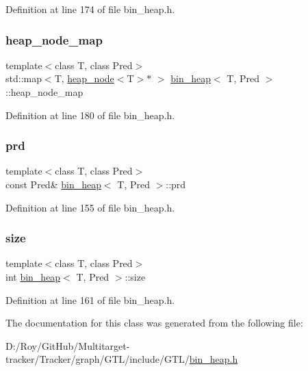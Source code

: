 Definition at line 174 of file bin\+\_\+heap.\+h.

\mbox{\label{classbin__heap_ab646175f97b352ca26587d23bf57c79f}} 
\subsubsection{\texorpdfstring{heap\+\_\+node\+\_\+map}{heap\_node\_map}}
{\footnotesize\ttfamily template$<$class T, class Pred$>$ \\
std\+::map$<$T, \mbox{\hyperlink{classheap__node}{heap\+\_\+node}}$<$T$>$$\ast$ $>$ \mbox{\hyperlink{classbin__heap}{bin\+\_\+heap}}$<$ T, Pred $>$\+::heap\+\_\+node\+\_\+map\hspace{0.3cm}{\ttfamily [private]}}



Definition at line 180 of file bin\+\_\+heap.\+h.

\mbox{\label{classbin__heap_a5ecc420dfd03a6a0b4c9328cac1fae14}} 
\subsubsection{\texorpdfstring{prd}{prd}}
{\footnotesize\ttfamily template$<$class T, class Pred$>$ \\
const Pred\& \mbox{\hyperlink{classbin__heap}{bin\+\_\+heap}}$<$ T, Pred $>$\+::prd\hspace{0.3cm}{\ttfamily [private]}}



Definition at line 155 of file bin\+\_\+heap.\+h.

\mbox{\label{classbin__heap_a8dde1008dcc24d734dbdb2c7ca50435b}} 
\subsubsection{\texorpdfstring{size}{size}}
{\footnotesize\ttfamily template$<$class T, class Pred$>$ \\
int \mbox{\hyperlink{classbin__heap}{bin\+\_\+heap}}$<$ T, Pred $>$\+::size\hspace{0.3cm}{\ttfamily [private]}}



Definition at line 161 of file bin\+\_\+heap.\+h.



The documentation for this class was generated from the following file\+:\begin{DoxyCompactItemize}
\item 
D\+:/\+Roy/\+Git\+Hub/\+Multitarget-\/tracker/\+Tracker/graph/\+G\+T\+L/include/\+G\+T\+L/\mbox{\hyperlink{bin__heap_8h}{bin\+\_\+heap.\+h}}\end{DoxyCompactItemize}
